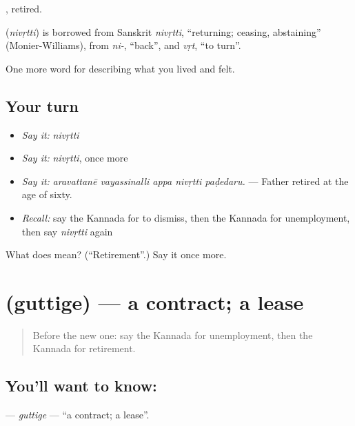 , retired.

\begin{cousinweb}
\textbf{} (\emph{nivṛtti}) is borrowed from Sanskrit \emph{nivṛtti}, \textquotedblleft{}returning; ceasing, abstaining\textquotedblright{} (Monier-Williams), from \emph{ni-}, \textquotedblleft{}back\textquotedblright{}, and \emph{vṛt}, \textquotedblleft{}to turn\textquotedblright{}.
\end{cousinweb}

\begin{grammarlens}[title={What you've built}]
One more word for describing what you lived and felt.
\end{grammarlens}

\subsection*{Your turn}
\begin{itemize}
\raggedright
  \item \emph{Say it:} \emph{nivṛtti}
  \item \emph{Say it:} \emph{nivṛtti}, once more
  \item \emph{Say it:} \emph{aravattanē vayassinalli appa nivṛtti paḍedaru.} — Father retired at the age of sixty.
  \item \emph{Recall:} say the Kannada for to dismiss, then the Kannada for unemployment, then say \emph{nivṛtti} again
\end{itemize}

\begin{tcolorbox}[breakable,colback=teal!4,colframe=teal!35!black,title={Before you move on}]
What does  mean? (\textquotedblleft{}Retirement\textquotedblright{}.) Say it once more.
\end{tcolorbox}
\section[\texorpdfstring{\kn{ಗುತ್ತಿಗೆ} (guttige)}{ಗುತ್ತಿಗೆ (guttige)}]{ (guttige) — a contract; a lease}

\label{lesson:KA-C518-guttige}



\begin{quote}
Before the new one: say the Kannada for unemployment, then the Kannada for retirement.
\end{quote}

\subsection*{You'll want to know: }
\textbf{} — \emph{guttige} — \textquotedblleft{}a contract; a lease\textquotedblright{}.

